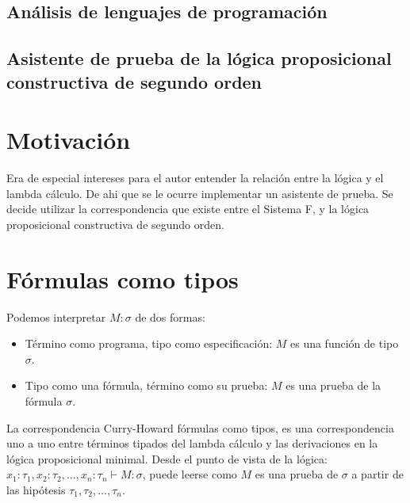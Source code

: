 \documentclass[a4paper,11pt]{article}
\title{}
\author{}
\theoremstyle{definition}
\begin{document}
\maketitle 

\begin{center}
\section*{Análisis de lenguajes de programación} 
\subsection*{Asistente de prueba de la lógica proposicional constructiva de segundo orden}
\end{center}

\newpage{\pagestyle{empty}\cleardoublepage}


\section{Motivación}
Era de especial intereses para el autor entender la relación entre la lógica y el lambda cálculo.
De ahi que se le ocurre implementar un asistente de prueba. Se decide utilizar la correspondencia
que existe entre el Sistema F, y la lógica proposicional constructiva de segundo orden.
 
\section{Fórmulas como tipos}
Podemos interpretar $M : \sigma$ de dos formas:
\begin{itemize}
  \item Término como programa, tipo como especificación: $M$ es una función de tipo $\sigma$.
  \item Tipo como una fórmula, término como su prueba: $M$ es una prueba de la fórmula $\sigma$.
\end{itemize}

La correspondencia Curry-Howard fórmulas como tipos, es una correspondencia uno a uno entre términos
tipados del lambda cálculo y las derivaciones en la lógica proposicional minimal.
Desde el punto de vista de la lógica: $x_{1}:\tau_{1}, x_{2}:\tau_{2}, \ldots, x_{n}:\tau_{n} \vdash M : \sigma$,
puede leerse como $M$ es una prueba de $\sigma$ a partir de las hipótesis $\tau_{1}, \tau_{2}, \ldots, \tau_{n}$.  
 
\end{document}
